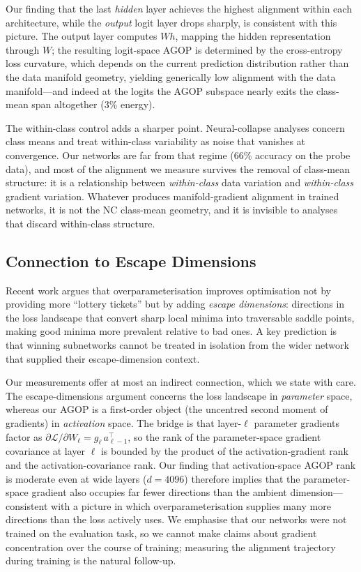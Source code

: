 \documentclass{article}
\begin{document}
Our finding that the last \emph{hidden} layer achieves the highest alignment
within each architecture, while the \emph{output} logit layer drops sharply,
is consistent with this picture.  The output layer computes $Wh$, mapping
the hidden representation through $W$; the resulting logit-space AGOP is
determined by the cross-entropy loss curvature, which depends on the current
prediction distribution rather than the data manifold geometry, yielding
generically low alignment with the data manifold---and indeed at the logits
the AGOP subspace nearly exits the class-mean span altogether (3\% energy).

The within-class control adds a sharper point.  Neural-collapse analyses
concern class means and treat within-class variability as noise that
vanishes at convergence.  Our networks are far from that regime (66\%
accuracy on the probe data), and most of the alignment we measure survives
the removal of class-mean structure: it is a relationship between
\emph{within-class} data variation and \emph{within-class} gradient
variation.  Whatever produces manifold-gradient alignment in trained
networks, it is not the NC class-mean geometry, and it is invisible to
analyses that discard within-class structure.

\subsection{Connection to Escape Dimensions}

Recent work \citep{martinelli2026escape} argues that overparameterisation
improves optimisation not by providing more ``lottery tickets''
\citep{frankle2019lottery} but by adding \emph{escape dimensions}: directions
in the loss landscape that convert sharp local minima into traversable saddle
points, making good minima more prevalent relative to bad ones.  A key
prediction is that winning subnetworks cannot be treated in isolation from the
wider network that supplied their escape-dimension context.

Our measurements offer at most an indirect connection, which we state with
care.  The escape-dimensions argument concerns the loss landscape in
\emph{parameter} space, whereas our AGOP is a first-order object (the
uncentred second moment of gradients) in \emph{activation} space.  The bridge
is that layer-$\ell$ parameter gradients factor as
$\partial\mathcal{L}/\partial W_\ell = g_\ell\, a_{\ell-1}^\top$, so the rank
of the parameter-space gradient covariance at layer $\ell$ is bounded by the
product of the activation-gradient rank and the activation-covariance rank.
Our finding that activation-space AGOP rank is moderate even at wide layers
($d=4096$) therefore implies that the parameter-space gradient also occupies
far fewer directions than the ambient dimension---consistent with a picture
in which overparameterisation supplies many more directions than the loss
actively uses.  We emphasise that our networks were not trained on the
evaluation task, so we cannot make claims about gradient concentration over
the course of training; measuring the alignment trajectory during training is
the natural follow-up.
\end{document}
